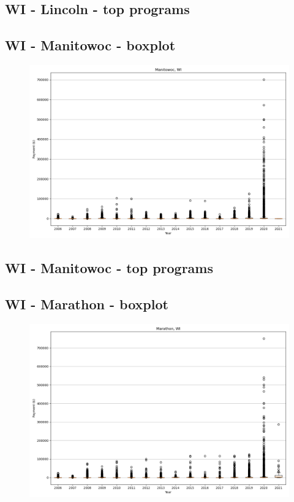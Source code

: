 \subsection*{WI - Lincoln - top programs}

\newpage
\subsection*{WI - Manitowoc - boxplot}
\begin{figure}[h]
\centering
\includegraphics[width=7in]{../output/boxplots/counties/Manitowoc-WI_boxplot.png}
\end{figure}


\subsection*{WI - Manitowoc - top programs}

\newpage
\subsection*{WI - Marathon - boxplot}
\begin{figure}[h]
\centering
\includegraphics[width=7in]{../output/boxplots/counties/Marathon-WI_boxplot.png}
\end{figure}


